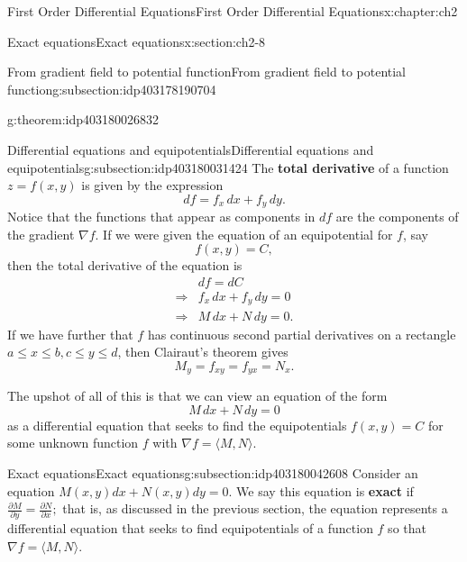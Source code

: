 \documentclass[oneside,10pt,]{book}
\newcommand{\terminology}[1]{\textbf{#1}}
\numberwithin{equation}{section}
\numberwithin{equation}{section}
\newcommand{\amp}{&}
\begin{document}
\begin{chapterptx}{First Order Differential Equations}{}{First Order Differential Equations}{}{}{x:chapter:ch2}
\begin{sectionptx}{Exact equations}{}{Exact equations}{}{}{x:section:ch2-8}
\begin{subsectionptx}{From gradient field to potential function}{}{From gradient field to potential function}{}{}{g:subsection:idp403178190704}
\begin{theorem}{}{}{g:theorem:idp403180026832}
%
\end{theorem}
\end{subsectionptx}
%
%
\typeout{************************************************}
\typeout{************************************************}
%
\begin{subsectionptx}{Differential equations and equipotentials}{}{Differential equations and equipotentials}{}{}{g:subsection:idp403180031424}
The \terminology{total derivative} of a function \(z = f(x,y)\) is given by the expression%
\begin{equation*}
df = f_x \, dx + f_y \, dy.
\end{equation*}
Notice that the functions that appear as components in \(df\) are the components of the gradient \(\nabla f\). If we were given the equation of an equipotential for \(f\), say%
\begin{equation*}
f(x, y) = C,
\end{equation*}
then the total derivative of the equation is%
\begin{align*}
\amp df = dC \\
\Rightarrow \amp f_x \, dx + f_y \, dy = 0\\
\Rightarrow \amp M \, dx + N \, dy = 0.
\end{align*}
If we have further that \(f\) has continuous second partial derivatives on a rectangle \(a \leq x \leq b, c \leq y \leq d\), then Clairaut's theorem gives%
\begin{equation*}
M_y = f_{xy} = f_{yx} = N_x.
\end{equation*}
%
\par
The upshot of all of this is that we can view an equation of the form%
\begin{equation*}
M \, dx + N \, dy = 0
\end{equation*}
as a differential equation that seeks to find the equipotentials \(f(x,y) = C\) for some unknown function \(f\) with \(\nabla f = \langle M, N \rangle\).%
\end{subsectionptx}
%
%
\typeout{************************************************}
\typeout{************************************************}
%
\begin{subsectionptx}{Exact equations}{}{Exact equations}{}{}{g:subsection:idp403180042608}
Consider an equation \(M(x,y)dx+N(x,y)dy=0.\) We say this equation is \terminology{exact} if \(\frac{\partial M}{\partial y}=\frac{\partial N}{\partial x};\) that is, as discussed in the previous section, the equation represents a differential equation that seeks to find equipotentials of a function \(f\) so that \(\nabla f = \langle M, N \rangle\).%

\end{subsectionptx}
\end{sectionptx}
\end{chapterptx}
\end{document}
